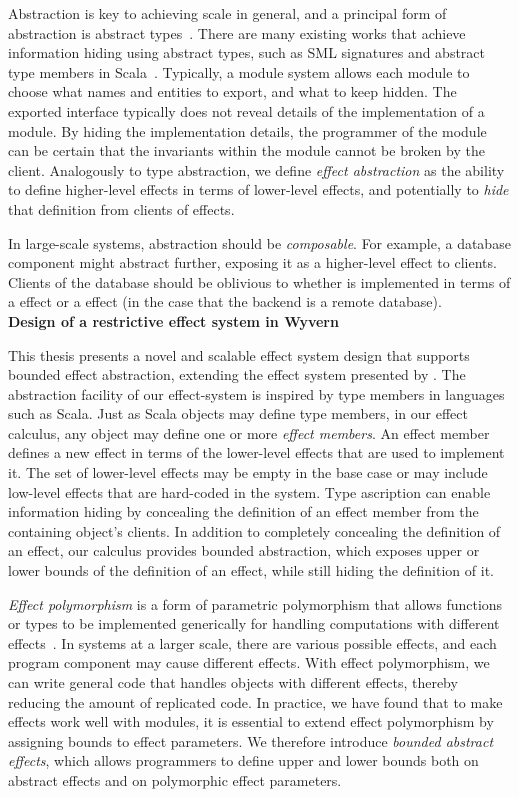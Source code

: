 Abstraction is key to achieving scale in general, and a principal form of abstraction is abstract types~\cite{10.1145/44501.45065}. 
There are many existing works that achieve information hiding using abstract types, such as SML signatures and abstract type members in Scala~\cite{odersky05}. 
Typically, a module system allows each module to choose what names and entities to export, and what to keep hidden. The exported interface typically does not reveal details of the implementation of a module. By hiding the implementation details, the programmer of the module can be certain that the invariants within the module cannot be broken by the client. Analogously to type abstraction, we define \textit{effect abstraction} as the ability to define higher-level effects in terms of lower-level effects, and potentially to \textit{hide} that definition from clients of effects.  

In large-scale systems, abstraction should be \textit{composable}.  For example, a database component might abstract  further, exposing it as a higher-level  effect to clients.  Clients of the database should be oblivious to whether  is implemented in terms of a  effect or a  effect (in the case that the backend is a remote database). \\

\noindent\textbf{Design of a restrictive effect system in Wyvern}

This thesis presents a novel and scalable effect system design that supports bounded effect abstraction, extending the effect system presented by \citet{melicher20}.  The abstraction facility of our effect-system is inspired by type members in languages such as Scala. Just as Scala objects may define type members, in our effect calculus, any object may define one or more \textit{effect members}.  An effect member defines a new effect in terms of the lower-level effects that are used to implement it.  The set of lower-level effects may be empty in the base case or may include low-level effects that are hard-coded in the system.  Type ascription can enable information hiding by concealing the definition of an effect member from the containing object's clients. In addition to completely concealing the definition of an effect, our calculus provides bounded abstraction, which exposes upper or lower bounds of the definition of an effect, while still hiding the definition of it.  


\textit{Effect polymorphism} is a form of parametric polymorphism that allows functions or types to be implemented generically for handling computations with different effects~\cite{lucassen88}. In systems at a larger scale, there are various possible effects, and each program component may cause different effects. With effect polymorphism, we can write general code that handles objects with different effects, thereby reducing the amount of replicated code. In practice, we have found that to make effects work well with modules, it is essential to extend effect polymorphism by assigning bounds to effect parameters. We therefore introduce \textit{bounded abstract effects}, which allows programmers to define upper and lower bounds both on abstract effects and on polymorphic effect parameters.

